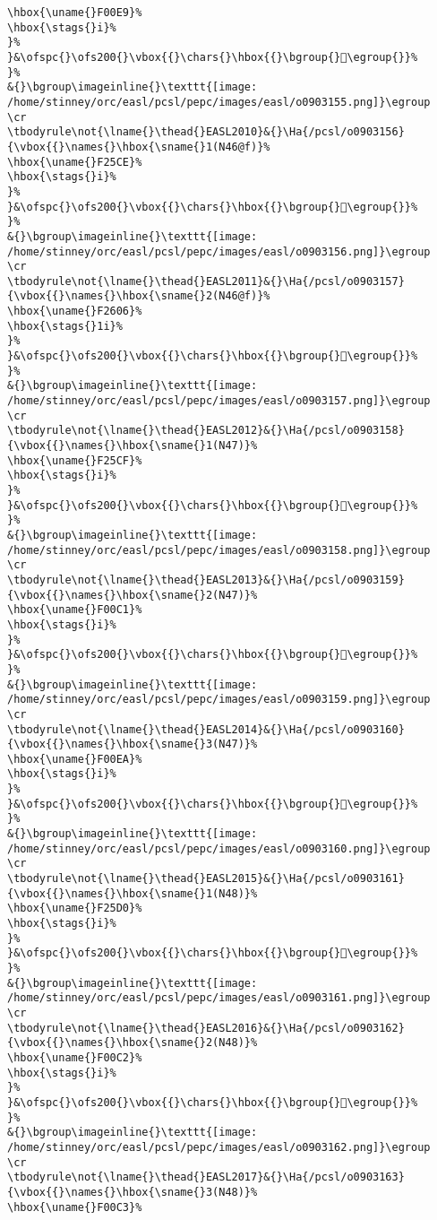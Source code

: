 \begin{verbatim}
\hbox{\uname{}F00E9}%
\hbox{\stags{}i}%
}%
}&\ofspc{}\ofs200{}\vbox{{}\chars{}\hbox{{}\bgroup{}󰃩\egroup{}}%
}%
&{}\bgroup\imageinline{}\texttt{[image: /home/stinney/orc/easl/pcsl/pepc/images/easl/o0903155.png]}\egroup
\cr
\tbodyrule\not{\lname{}\thead{}EASL2010}&{}\Ha{/pcsl/o0903156}{\vbox{{}\names{}\hbox{\sname{}1(N46@f)}%
\hbox{\uname{}F25CE}%
\hbox{\stags{}i}%
}%
}&\ofspc{}\ofs200{}\vbox{{}\chars{}\hbox{{}\bgroup{}󲗎\egroup{}}%
}%
&{}\bgroup\imageinline{}\texttt{[image: /home/stinney/orc/easl/pcsl/pepc/images/easl/o0903156.png]}\egroup
\cr
\tbodyrule\not{\lname{}\thead{}EASL2011}&{}\Ha{/pcsl/o0903157}{\vbox{{}\names{}\hbox{\sname{}2(N46@f)}%
\hbox{\uname{}F2606}%
\hbox{\stags{}1i}%
}%
}&\ofspc{}\ofs200{}\vbox{{}\chars{}\hbox{{}\bgroup{}󲘆\egroup{}}%
}%
&{}\bgroup\imageinline{}\texttt{[image: /home/stinney/orc/easl/pcsl/pepc/images/easl/o0903157.png]}\egroup
\cr
\tbodyrule\not{\lname{}\thead{}EASL2012}&{}\Ha{/pcsl/o0903158}{\vbox{{}\names{}\hbox{\sname{}1(N47)}%
\hbox{\uname{}F25CF}%
\hbox{\stags{}i}%
}%
}&\ofspc{}\ofs200{}\vbox{{}\chars{}\hbox{{}\bgroup{}󲗏\egroup{}}%
}%
&{}\bgroup\imageinline{}\texttt{[image: /home/stinney/orc/easl/pcsl/pepc/images/easl/o0903158.png]}\egroup
\cr
\tbodyrule\not{\lname{}\thead{}EASL2013}&{}\Ha{/pcsl/o0903159}{\vbox{{}\names{}\hbox{\sname{}2(N47)}%
\hbox{\uname{}F00C1}%
\hbox{\stags{}i}%
}%
}&\ofspc{}\ofs200{}\vbox{{}\chars{}\hbox{{}\bgroup{}󰃁\egroup{}}%
}%
&{}\bgroup\imageinline{}\texttt{[image: /home/stinney/orc/easl/pcsl/pepc/images/easl/o0903159.png]}\egroup
\cr
\tbodyrule\not{\lname{}\thead{}EASL2014}&{}\Ha{/pcsl/o0903160}{\vbox{{}\names{}\hbox{\sname{}3(N47)}%
\hbox{\uname{}F00EA}%
\hbox{\stags{}i}%
}%
}&\ofspc{}\ofs200{}\vbox{{}\chars{}\hbox{{}\bgroup{}󰃪\egroup{}}%
}%
&{}\bgroup\imageinline{}\texttt{[image: /home/stinney/orc/easl/pcsl/pepc/images/easl/o0903160.png]}\egroup
\cr
\tbodyrule\not{\lname{}\thead{}EASL2015}&{}\Ha{/pcsl/o0903161}{\vbox{{}\names{}\hbox{\sname{}1(N48)}%
\hbox{\uname{}F25D0}%
\hbox{\stags{}i}%
}%
}&\ofspc{}\ofs200{}\vbox{{}\chars{}\hbox{{}\bgroup{}󲗐\egroup{}}%
}%
&{}\bgroup\imageinline{}\texttt{[image: /home/stinney/orc/easl/pcsl/pepc/images/easl/o0903161.png]}\egroup
\cr
\tbodyrule\not{\lname{}\thead{}EASL2016}&{}\Ha{/pcsl/o0903162}{\vbox{{}\names{}\hbox{\sname{}2(N48)}%
\hbox{\uname{}F00C2}%
\hbox{\stags{}i}%
}%
}&\ofspc{}\ofs200{}\vbox{{}\chars{}\hbox{{}\bgroup{}󰃂\egroup{}}%
}%
&{}\bgroup\imageinline{}\texttt{[image: /home/stinney/orc/easl/pcsl/pepc/images/easl/o0903162.png]}\egroup
\cr
\tbodyrule\not{\lname{}\thead{}EASL2017}&{}\Ha{/pcsl/o0903163}{\vbox{{}\names{}\hbox{\sname{}3(N48)}%
\hbox{\uname{}F00C3}%

\end{verbatim}
